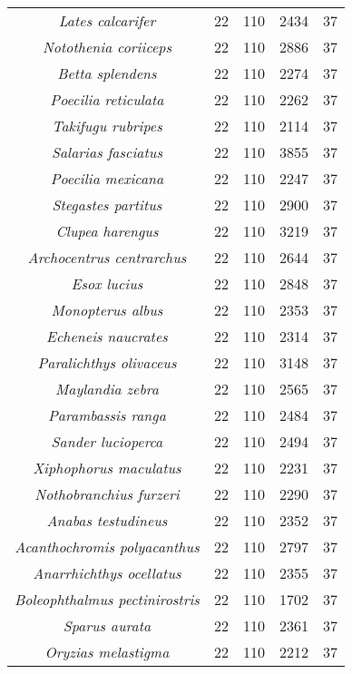 \begin{longtable}[c]{|c|c|c|c|c|}
\textit{Lates calcarifer}              & 22  & 110 & 2434 & 37 \\
\textit{Notothenia coriiceps}          & 22  & 110 & 2886 & 37 \\
\textit{Betta splendens}               & 22  & 110 & 2274 & 37 \\
\textit{Poecilia reticulata}           & 22  & 110 & 2262 & 37 \\
\textit{Takifugu rubripes}             & 22  & 110 & 2114 & 37 \\
\textit{Salarias fasciatus}            & 22  & 110 & 3855 & 37 \\
\textit{Poecilia mexicana}             & 22  & 110 & 2247 & 37 \\
\textit{Stegastes partitus}            & 22  & 110 & 2900 & 37 \\
\textit{Clupea harengus}               & 22  & 110 & 3219 & 37 \\
\textit{Archocentrus centrarchus}      & 22  & 110 & 2644 & 37 \\
\textit{Esox lucius}                   & 22  & 110 & 2848 & 37 \\
\textit{Monopterus albus}              & 22  & 110 & 2353 & 37 \\
\textit{Echeneis naucrates}            & 22  & 110 & 2314 & 37 \\
\textit{Paralichthys olivaceus}        & 22  & 110 & 3148 & 37 \\
\textit{Maylandia zebra}               & 22  & 110 & 2565 & 37 \\
\textit{Parambassis ranga}             & 22  & 110 & 2484 & 37 \\
\textit{Sander lucioperca}             & 22  & 110 & 2494 & 37 \\
\textit{Xiphophorus maculatus}         & 22  & 110 & 2231 & 37 \\
\textit{Nothobranchius furzeri}        & 22  & 110 & 2290 & 37 \\
\textit{Anabas testudineus}            & 22  & 110 & 2352 & 37 \\
\textit{Acanthochromis polyacanthus}   & 22  & 110 & 2797 & 37 \\
\textit{Anarrhichthys ocellatus}       & 22  & 110 & 2355 & 37 \\
\textit{Boleophthalmus pectinirostris} & 22  & 110 & 1702 & 37 \\
\textit{Sparus aurata}                 & 22  & 110 & 2361 & 37 \\
\textit{Oryzias melastigma}            & 22  & 110 & 2212 & 37 \\

\end{longtable}
